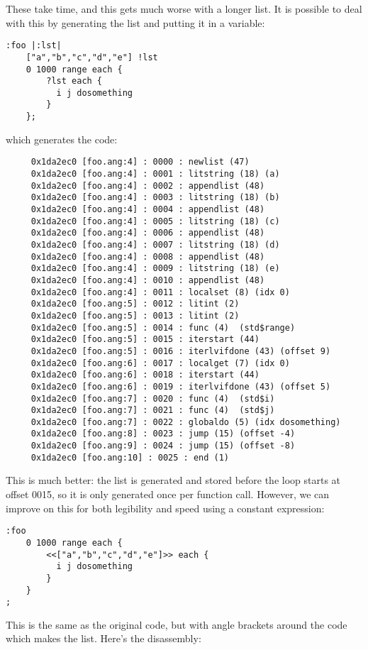 These take time, and this gets much worse with a longer list. It is possible
to deal with this by generating the list and putting it in a variable:
\begin{lstlisting}
:foo |:lst|
    ["a","b","c","d","e"] !lst
    0 1000 range each {
        ?lst each {
          i j dosomething
        }
    };
\end{lstlisting}
which generates the code:
\begin{lstlisting}
     0x1da2ec0 [foo.ang:4] : 0000 : newlist (47) 
     0x1da2ec0 [foo.ang:4] : 0001 : litstring (18) (a)
     0x1da2ec0 [foo.ang:4] : 0002 : appendlist (48) 
     0x1da2ec0 [foo.ang:4] : 0003 : litstring (18) (b)
     0x1da2ec0 [foo.ang:4] : 0004 : appendlist (48) 
     0x1da2ec0 [foo.ang:4] : 0005 : litstring (18) (c)
     0x1da2ec0 [foo.ang:4] : 0006 : appendlist (48) 
     0x1da2ec0 [foo.ang:4] : 0007 : litstring (18) (d)
     0x1da2ec0 [foo.ang:4] : 0008 : appendlist (48) 
     0x1da2ec0 [foo.ang:4] : 0009 : litstring (18) (e)
     0x1da2ec0 [foo.ang:4] : 0010 : appendlist (48) 
     0x1da2ec0 [foo.ang:4] : 0011 : localset (8) (idx 0)
     0x1da2ec0 [foo.ang:5] : 0012 : litint (2) 
     0x1da2ec0 [foo.ang:5] : 0013 : litint (2) 
     0x1da2ec0 [foo.ang:5] : 0014 : func (4)  (std$range)
     0x1da2ec0 [foo.ang:5] : 0015 : iterstart (44) 
     0x1da2ec0 [foo.ang:5] : 0016 : iterlvifdone (43) (offset 9)
     0x1da2ec0 [foo.ang:6] : 0017 : localget (7) (idx 0)
     0x1da2ec0 [foo.ang:6] : 0018 : iterstart (44) 
     0x1da2ec0 [foo.ang:6] : 0019 : iterlvifdone (43) (offset 5)
     0x1da2ec0 [foo.ang:7] : 0020 : func (4)  (std$i)
     0x1da2ec0 [foo.ang:7] : 0021 : func (4)  (std$j)
     0x1da2ec0 [foo.ang:7] : 0022 : globaldo (5) (idx dosomething)
     0x1da2ec0 [foo.ang:8] : 0023 : jump (15) (offset -4)
     0x1da2ec0 [foo.ang:9] : 0024 : jump (15) (offset -8)
     0x1da2ec0 [foo.ang:10] : 0025 : end (1) 
\end{lstlisting}
This is much better: the list is generated and stored before the loop
starts at offset 0015, so it is only generated once per function call.
However, we can improve on this for both legibility and speed using
a constant expression:
\begin{lstlisting}
:foo
    0 1000 range each {
        <<["a","b","c","d","e"]>> each {
          i j dosomething
        }
    }
;
\end{lstlisting}
This is the same as the original code, but with angle brackets around
the code which makes the list. Here's the disassembly:
